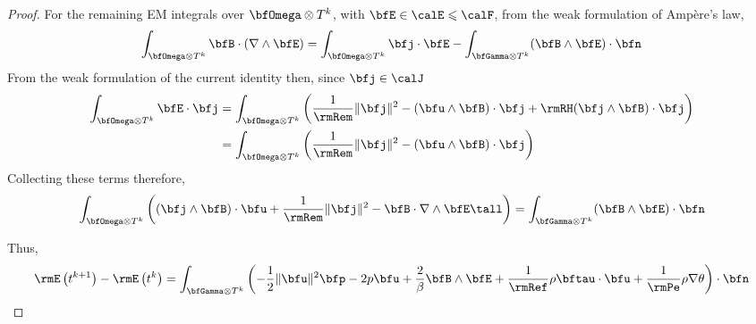 \begin{proof}
            For the remaining EM integrals over $\bfOmega\otimes T^{k}$, with $\bfE  \in  \calE  \leqslant  \calF$, from the weak formulation of Ampère's law,
            \begin{equation}
                \int_{\bfOmega\otimes T^{k}}\bfB\cdot(\nabla\wedge\bfE)  =  \int_{\bfOmega\otimes T^{k}}\bfj\cdot\bfE - \int_{\bfGamma\otimes T^{k}}(\bfB\wedge\bfE)\cdot\bfn
            \end{equation}
            From the weak formulation of the current identity then, since $\bfj  \in  \calJ$
            \begin{align}
                \int_{\bfOmega\otimes T^{k}}\bfE\cdot\bfj  &=  \int_{\bfOmega\otimes T^{k}}\left(\frac{1}{\rmRem}\|\bfj\|^{2} - (\bfu\wedge\bfB)\cdot\bfj + \rmRH(\bfj\wedge\bfB)\cdot\bfj\right)  \\
                &=  \int_{\bfOmega\otimes T^{k}}\left(\frac{1}{\rmRem}\|\bfj\|^{2} - (\bfu\wedge\bfB)\cdot\bfj\right)
            \end{align}
            Collecting these terms therefore,
            \begin{equation}
                \int_{\bfOmega\otimes T^{k}}\left((\bfj\wedge\bfB)\cdot\bfu + \frac{1}{\rmRem}\|\bfj\|^{2} - \bfB\cdot\nabla\wedge\bfE\tall\right)  =  \int_{\bfGamma\otimes T^{k}}(\bfB\wedge\bfE)\cdot\bfn
            \end{equation}
    
            Thus,
            \begin{equation}
                \rmE\left(t^{k + 1}\right) - \rmE\left(t^{k}\right)  =  \int_{\bfGamma\otimes T^{k}}\left(- \frac{1}{2}\|\bfu\|^{2}\bfp - 2p\bfu + \frac{2}{\beta}\bfB\wedge\bfE + \frac{1}{\rmRef}\rho\bftau\cdot\bfu + \frac{1}{\rmPe}\rho\nabla\theta\right)\cdot\bfn
            \end{equation}
        \end{proof}
    
